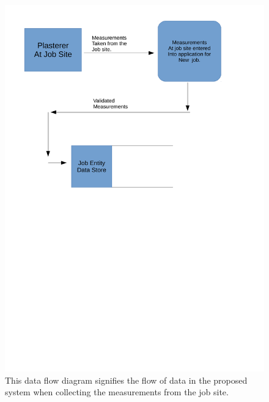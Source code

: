 \begin{figure}[H]
\includegraphics[width=\textwidth]{./Analysis/images/proposedSystemGettingMeasurements.pdf}
    \caption{This data flow diagram signifies the flow of data in the proposed system when collecting the measurements from the job site.} \label{fig:proposed_system_dfd_2}
\end{figure}


